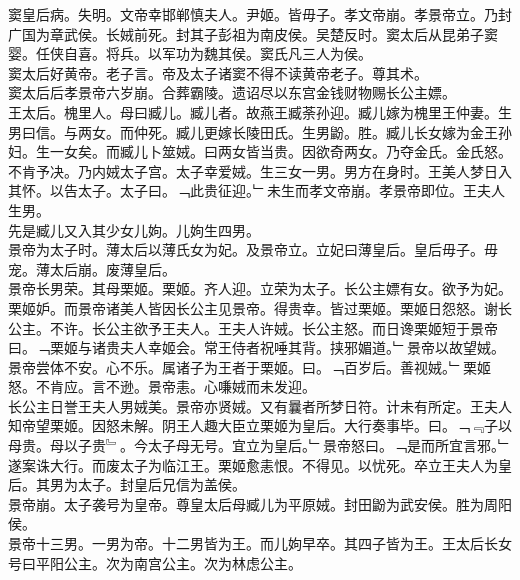 \documentclass{zhvt-classic}
\begin{document}
\hspace*{2em}窦皇后病。失明。文帝幸邯郸慎夫人。尹姬。皆毋子。孝文帝崩。孝景帝立。乃封广国为章武侯。长娀前死。封其子彭祖为南皮侯。吴楚反时。窦太后从昆弟子窦婴。任侠自喜。将兵。以军功为魏其侯。窦氏凡三人为侯。\\
\hspace*{2em}窦太后好黄帝。老子言。帝及太子诸窦不得不读黄帝老子。尊其术。\\
\hspace*{2em}窦太后后孝景帝六岁崩。合葬霸陵。遗诏尽以东宫金钱财物赐长公主嫖。\\
\hspace*{2em}王太后。槐里人。母曰臧儿。臧儿者。故燕王臧荼孙迎。臧儿嫁为槐里王仲妻。生男曰信。与两女。而仲死。臧儿更嫁长陵田氏。生男鼢。胜。臧儿长女嫁为金王孙妇。生一女矣。而臧儿卜筮娀。曰两女皆当贵。因欲奇两女。乃夺金氏。金氏怒。不肯予决。乃内娀太子宫。太子幸爱娀。生三女一男。男方在身时。王美人梦日入其怀。以告太子。太子曰。﹁此贵征迎。﹂未生而孝文帝崩。孝景帝即位。王夫人生男。\\
\hspace*{2em}先是臧儿又入其少女儿姁。儿姁生四男。\\
\hspace*{2em}景帝为太子时。薄太后以薄氏女为妃。及景帝立。立妃曰薄皇后。皇后毋子。毋宠。薄太后崩。废薄皇后。\\
\hspace*{2em}景帝长男荣。其母栗姬。栗姬。齐人迎。立荣为太子。长公主嫖有女。欲予为妃。栗姬妒。而景帝诸美人皆因长公主见景帝。得贵幸。皆过栗姬。栗姬日怨怒。谢长公主。不许。长公主欲予王夫人。王夫人许娀。长公主怒。而日谗栗姬短于景帝曰。﹁栗姬与诸贵夫人幸姬会。常王侍者祝唾其背。挟邪媚道。﹂景帝以故望娀。\\
\hspace*{2em}景帝尝体不安。心不乐。属诸子为王者于栗姬。曰。﹁百岁后。善视娀。﹂栗姬怒。不肯应。言不逊。景帝恚。心嗛娀而未发迎。\\
\hspace*{2em}长公主日誉王夫人男娀美。景帝亦贤娀。又有曩者所梦日符。计未有所定。王夫人知帝望栗姬。因怒未解。阴王人趣大臣立栗姬为皇后。大行奏事毕。曰。﹁﹃子以母贵。母以子贵﹄。今太子母无号。宜立为皇后。﹂景帝怒曰。﹁是而所宜言邪。﹂遂案诛大行。而废太子为临江王。栗姬愈恚恨。不得见。以忧死。卒立王夫人为皇后。其男为太子。封皇后兄信为盖侯。\\
\hspace*{2em}景帝崩。太子袭号为皇帝。尊皇太后母臧儿为平原娀。封田鼢为武安侯。胜为周阳侯。\\
\hspace*{2em}景帝十三男。一男为帝。十二男皆为王。而儿姁早卒。其四子皆为王。王太后长女号曰平阳公主。次为南宫公主。次为林虑公主。\\
\end{document}
